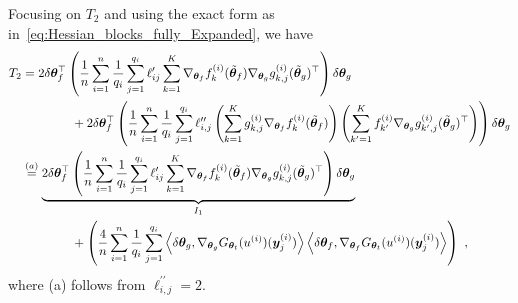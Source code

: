 Focusing on $T_2$ and using the exact form as in~\eqref{eq:Hessian_blocks_fully_Expanded}, we have
\begin{align*}
    T_2 & = 2\delta {\bm{\theta}}_f^\top \left(\frac{1}{n} \sum_{i=1}^n \frac{1}{q_i} \sum_{j=1}^{q_i} \ell'_{ij} \sum_{k=1}^K \nabla_{{\bm{\theta}}_f} f_k^{(i)}(\tilde{{\bm{\theta}}}_f) \nabla_{{\bm{\theta}}_g} g_{k,j}^{(i)}(\tilde{{\bm{\theta}}}_g)^\top \right) \delta {\bm{\theta}}_g \nonumber \\
    & \qquad \qquad + 2\delta {\bm{\theta}}_f^\top \left( \frac{1}{n} \sum_{i=1}^n \frac{1}{q_i} \sum_{j=1}^{q_i}\ell^{\prime\prime}_{i,j} \left(\sum_{k=1}^K g_{k,j}^{(i)} \nabla_{{\bm{\theta}}_f} f_k^{(i)}(\tilde{{\bm{\theta}}}_f) \right) \left( \sum_{k'=1}^K f_{k'}^{(i)} \nabla_{{\bm{\theta}}_g} g_{k',j}^{(i)}(\tilde{{\bm{\theta}}}_g)^\top \right) \right) \delta {\bm{\theta}}_g\\
    & \overset{(a)}{=} \underbrace{2\delta {\bm{\theta}}_f^\top \left(\frac{1}{n} \sum_{i=1}^n \frac{1}{q_i} \sum_{j=1}^{q_i} \ell'_{ij} \sum_{k=1}^K \nabla_{{\bm{\theta}}_f} f_k^{(i)}(\tilde{{\bm{\theta}}}_f) \nabla_{{\bm{\theta}}_g} g_{k,j}^{(i)}(\tilde{{\bm{\theta}}}_g)^\top \right) \delta {\bm{\theta}}_g}_{I_1} \nonumber \\
    & \qquad \qquad + \left( \frac{4}{n} \sum_{i=1}^n \frac{1}{q_i} 
    \sum_{j=1}^{q_i} 
    \left\langle \delta {\bm{\theta}}_g ,  \nabla_{{\bm{\theta}}_g} G_{{\bm{\theta}}_t}(u^{(i)})({\bm{y}}^{(i)}_j) \right\rangle
\left\langle \delta {\bm{\theta}}_f ,  \nabla_{{\bm{\theta}}_f} G_{{\bm{\theta}}_t}(u^{(i)})({\bm{y}}^{(i)}_j)\right\rangle\right)~,
\end{align*}
where (a) follows from $\ell^{\prime\prime}_{i,j}=2$.

